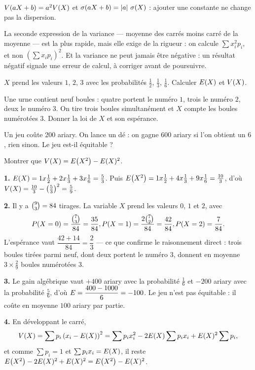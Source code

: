 \begin{propriete}
$\Var(aX+b) = a^{2}\Var(X)$ et $\ecart(aX+b) = \abs a\,\ecart(X)$ : ajouter
une constante ne change pas la dispersion.
\end{propriete}

\begin{avertissement}
La seconde expression de la variance — moyenne des carrés moins carré de la
moyenne — est la plus rapide, mais elle exige de la rigueur : on calcule
$\sum x_{i}^{2}p_{i}$, et non $\left(\sum x_{i}p_{i}\right)^{2}$. Et la
variance ne peut jamais être négative : un résultat négatif signale une erreur
de calcul, à corriger avant de poursuivre.
\end{avertissement}

\begin{entrainement}
\exo[\niveau{1}] $X$ prend les valeurs $1$, $2$, $3$ avec les probabilités
$\frac12$, $\frac13$, $\frac16$. Calculer $\Esp(X)$ et $\Var(X)$.

\exo[\niveau{2}] Une urne contient neuf boules : quatre portent le numéro $1$,
trois le numéro $2$, deux le numéro $3$. On tire trois boules simultanément et
$X$ compte les boules numérotées $3$. Donner la loi de $X$ et son espérance.

\exo[\niveau{2}] Un jeu coûte $200$ ariary. On lance un dé : on gagne $600$
ariary si l'on obtient un $6$, rien sinon. Le jeu est-il équitable ?

\exo[\niveau{3}] Montrer que
$\Var(X) = \Esp\!\left(X^{2}\right)-\Esp(X)^{2}$.
\end{entrainement}

\begin{corrige}
\textbf{1.} $\Esp(X) = 1\times\frac12+2\times\frac13+3\times\frac16
= \frac53$. Puis
$\Esp\!\left(X^{2}\right) = 1\times\frac12+4\times\frac13+9\times\frac16
= \frac{10}{3}$, d'où
$\Var(X) = \frac{10}{3}-\left(\frac53\right)^{2} = \frac59$.

\textbf{2.} Il y a $\combi{3}{9} = 84$ tirages. La variable $X$ prend les
valeurs $0$, $1$ et $2$, avec
\[
  \proba{X=0} = \frac{\combi{3}{7}}{84} = \frac{35}{84}, \quad
  \proba{X=1} = \frac{2\combi{2}{7}}{84} = \frac{42}{84}, \quad
  \proba{X=2} = \frac{7}{84}.
\]
L'espérance vaut $\dfrac{42+14}{84} = \dfrac23$ — ce que confirme le
raisonnement direct : trois boules tirées parmi neuf, dont deux portent le
numéro $3$, donnent en moyenne $3 \times \frac29$ boules numérotées $3$.

\textbf{3.} Le gain algébrique vaut $+400$ ariary avec la probabilité
$\frac16$ et $-200$ ariary avec la probabilité $\frac56$, d'où
$\Esp = \dfrac{400-1000}{6} = -100$. Le jeu n'est pas équitable : il coûte en
moyenne $100$ ariary par partie.

\textbf{4.} En développant le carré,
\[
  \Var(X) = \sum p_{i}\left(x_{i}-\Esp(X)\right)^{2}
  = \sum p_{i}x_{i}^{2}-2\Esp(X)\sum p_{i}x_{i}+\Esp(X)^{2}\sum p_{i},
\]
et comme $\sum p_{i} = 1$ et $\sum p_{i}x_{i} = \Esp(X)$, il reste
$\Esp\!\left(X^{2}\right)-2\Esp(X)^{2}+\Esp(X)^{2}
= \Esp\!\left(X^{2}\right)-\Esp(X)^{2}$.
\end{corrige}

